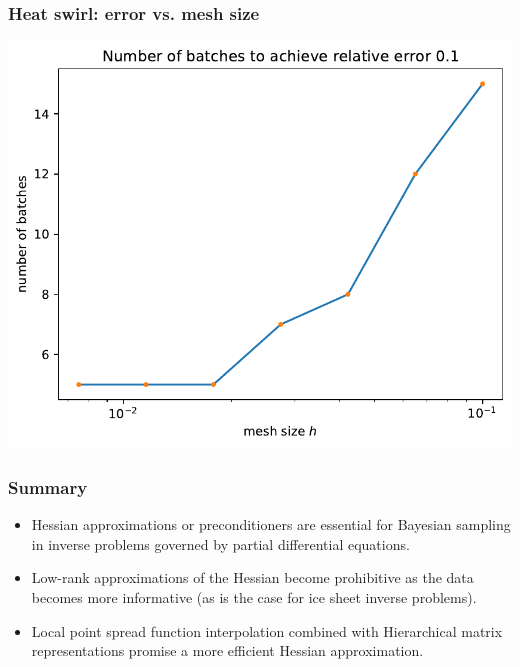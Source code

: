 \documentclass[10pt,final,xcolor=dvipsnames]{beamer}
\begin{document}
\begin{frame}
	\frametitle{Heat swirl: error vs. mesh size}
	\begin{center}
		\includegraphics[width=0.75\columnwidth]{error_vs_mesh_size.pdf}
	\end{center}
\end{frame}
\begin{frame}
  \frametitle{Summary}

  \begin{itemize}
  	\setlength\itemsep{2em}
  \item Hessian approximations or preconditioners are essential for Bayesian sampling in inverse problems governed by
    partial differential equations.
    \vspace{0.05in}
  \item Low-rank approximations of the Hessian become
    prohibitive as the data becomes more informative (as is the case
    for ice sheet inverse problems).
    \vspace{0.05in}
  \item Local point spread function interpolation combined with Hierarchical matrix representations promise a more efficient
    Hessian approximation.
  \end{itemize}
    \vspace{0.2in}
\end{frame}
\end{document}
